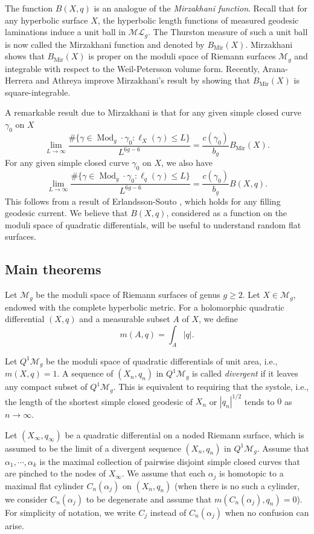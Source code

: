 \documentclass{amsart}
\theoremstyle{plain}
\theoremstyle{definition}
\numberwithin{equation}{section}
\newcommand{\ML}{\mathcal{ML}_g}
\newcommand{\Mod}{\operatorname{Mod}_g}
\newcommand{\Mir}{B_{\operatorname{Mir}}}
\begin{document}
The function $B(X,q)$ is an analogue of the \emph{Mirzakhani function}. 
Recall that for any hyperbolic surface $X$, the hyperbolic length functions 
of measured geodesic laminations induce a  unit ball in $\ML$.
The Thurston measure of such a unit ball is now called the Mirzakhani function and denoted by 
$\Mir(X)$.
Mirzakhani \cite[Theorem 3.3]{Mir2008}
shows that $\Mir(X)$ is proper on the moduli space of Riemann surfaces $\mathcal{M}_g$ and integrable with respect to the Weil-Petersson volume form.
Recently,
Arana-Herrera and Athreya \cite{AA}
improve Mirzakhani's result by showing that
$\Mir(X)$ is square-integrable.

A remarkable result due to Mirzakhani is that
for any given simple closed curve $\gamma_0$ on $X$ 
\begin{equation*}\label{equ:Mir}
 \lim_{L \to \infty} \frac{\# \{\gamma \in \Mod \cdot \gamma_0 : \ell_X(\gamma) \leq L \}}{L^{6g-6}} = \frac{c(\gamma_0)}{b_g} \Mir(X).
\end{equation*}
For any given simple closed curve $\gamma_0$ on $X$, we also have  
$$\lim_{L \to \infty} \frac{\# \{\gamma \in \Mod \cdot \gamma_0 : \ell_q(\gamma) \leq L \}}{L^{6g-6}} = \frac{c(\gamma_0)}{b_g} B(X,q).$$
This follows from a result of Erlandsson-Souto \cite[Theorem 1.2]{ES},
which holds 
for any filling geodesic current. We believe that $B(X,q)$, 
considered as a function on the moduli space of quadratic differentials, will  be useful to understand random flat surfaces. 


\subsection{Main theorems}
Let $\mathcal{M}_g$ be the moduli space of Riemann surfaces of genus $g\geq 2$.
Let $X\in \mathcal{M}_g$, 
endowed with the complete hyperbolic metric.
For a holomorphic quadratic differential $(X,q)$ and a measurable subset $A$ of $X$, we define 
$$m(A, q) = \int_A |q|.$$


Let $Q^1\mathcal{M}_{g}$ be the moduli space of quadratic differentials 
of unit area, i.e., $m(X,q)=1$.
A sequence of $(X_n,q_n)$ in $Q^1\mathcal{M}_{g}$ is called \emph{divergent}
if it leaves any compact subset of $Q^1\mathcal{M}_{g}$.
This is equivalent to requiring that the systole, i.e., the
 length of the shortest simple closed geodesic of $X_n$ or $|q_n|^{1/2}$
tends to $0$ as $n\to\infty$. 



Let $(X_\infty, q_\infty)$ be a quadratic differential on a noded Riemann surface,
which is assumed to be the limit of a divergent sequence $ (X_n,q_n)$ in $Q^1\mathcal{M}_{g}$. 
Assume that $\alpha_1, \cdots, \alpha_k$ is the maximal collection of pairwise disjoint simple closed curves
that are pinched to the nodes of $X_\infty$. 
We assume that each $\alpha_j$ is homotopic to a maximal flat cylinder $C_n(\alpha_j)$  on $(X_n,q_n)$ (when there is no such a cylinder,  we consider $C_n(\alpha_j)$ to be degenerate and assume that $m(C_n(\alpha_j), q_n)=0$). 
 For simplicity of notation,
we write  $C_j$ instead of  $C_n(\alpha_j)$ when no confusion can arise. 
\end{document}
